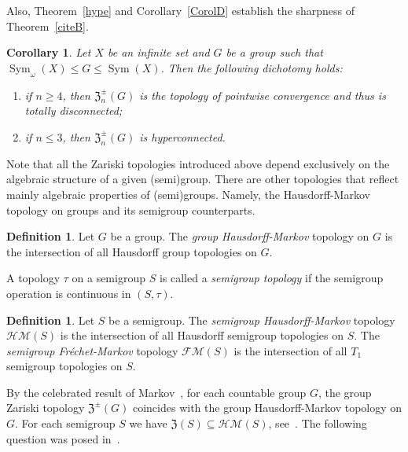 \documentclass[11pt]{amsart}
\newtheorem{corollary}[theorem]{Corollary}
\theoremstyle{definition}
\newtheorem{definition}[theorem]{Definition}
\newcommand{\Sym}{\operatorname{Sym}}
\begin{document}
Also, Theorem~\ref{hype} and Corollary~\ref{CorolD} establish the sharpness of Theorem~\ref{citeB}.

\begin{corollary}
  Let $X$ be an infinite set and $G$ be a group such that $\Sym_\omega(X)\leq G\leq \Sym(X)$. Then the following dichotomy holds:
  \begin{enumerate}[\rm(i)]
  \item if $n\geq 4$, then $\mathfrak{Z}_n^{\pm}(G)$ is the topology of pointwise convergence and thus is totally disconnected;
  \item if $n\leq 3$, then $\mathfrak{Z}_n^{\pm}(G)$ is hyperconnected.
  \end{enumerate}
\end{corollary}

Note that all the Zariski topologies introduced above depend exclusively on the algebraic structure of a given (semi)group. There are other topologies that reflect mainly algebraic properties of (semi)groups. Namely, the Hausdorff-Markov topology on groups and its semigroup counterparts.

\begin{definition}
Let $G$ be a group. The {\em group Hausdorff-Markov} topology on $G$ is the intersection of all Hausdorff group topologies on $G$.      
\end{definition}

A topology $\tau$ on a semigroup $S$ is called a {\em semigroup topology} if the semigroup operation is continuous in $(S,\tau)$.

\begin{definition}
Let $S$ be a semigroup. The {\em semigroup Hausdorff-Markov} topology $\mathcal {HM}(S)$ is the intersection of all Hausdorff semigroup topologies on $S$. The {\em semigroup Fr\'echet-Markov} topology $\mathcal {FM}(S)$ is the intersection of all $T_1$ semigroup topologies on $S$.     
\end{definition}

By the celebrated result of Markov~\cite{Markov}, for each countable group $G$, the group Zariski topology $\mathfrak{Z}^{\pm}(G)$ coincides with the group Hausdorff-Markov topology on  $G$. For each semigroup $S$ we have $\mathfrak{Z}(S)\subseteq \mathcal{HM}(S)$, see~\cite{main}. The following question was posed in~\cite[Question 2.7]{main}.
\end{document}

